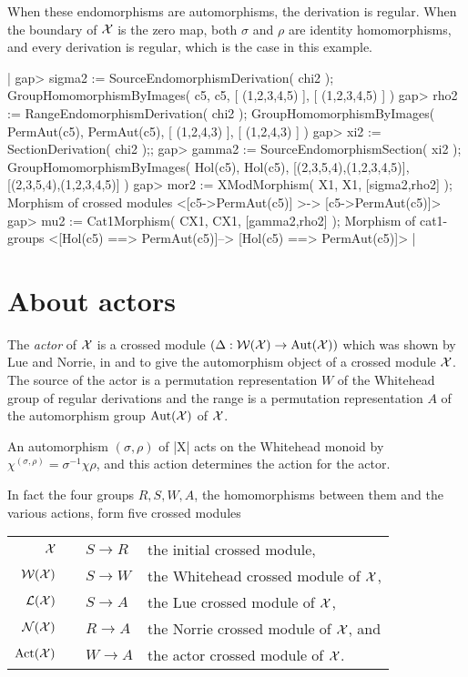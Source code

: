 When these endomorphisms are automorphisms, the derivation is regular.  
When the boundary of ${\cal X}$ is the zero map,
both $\sigma$ and $\rho$ are identity homomorphisms, 
and every derivation is regular, which is the case in this example.

|    gap> sigma2 := SourceEndomorphismDerivation( chi2 );
    GroupHomomorphismByImages( c5, c5, [ (1,2,3,4,5) ], [ (1,2,3,4,5) ] )
    gap> rho2 := RangeEndomorphismDerivation( chi2 );
    GroupHomomorphismByImages( PermAut(c5), PermAut(c5), [ (1,2,4,3) ], 
       [ (1,2,4,3) ] )
    gap> xi2 := SectionDerivation( chi2 );;
    gap> gamma2 := SourceEndomorphismSection( xi2 );
    GroupHomomorphismByImages( Hol(c5), Hol(c5), [(2,3,5,4),(1,2,3,4,5)],
       [(2,3,5,4),(1,2,3,4,5)] )
    gap> mor2 := XModMorphism( X1, X1, [sigma2,rho2] );
    Morphism of crossed modules <[c5->PermAut(c5)] >-> [c5->PermAut(c5)]>
    gap> mu2 := Cat1Morphism( CX1, CX1, [gamma2,rho2] );
    Morphism of cat1-groups <[Hol(c5) ==> PermAut(c5)]-->
       [Hol(c5) ==> PermAut(c5)]>  |



\section{About actors}


The \emph{actor} of ${\cal X}$  is a crossed module
$(\Delta \: {\cal W}({\cal X}) \to {\rm Aut}({\cal X}))$
which was shown by Lue and Norrie, in \cite{N2} and \cite{N1} to give
the automorphism object of a crossed module ${\cal X}$.
The source of the actor is a permutation representation $W$ 
of the Whitehead group of regular derivations and the range is a 
permutation representation $A$ of the automorphism group 
${\rm Aut}({\cal X})$ of ${\cal X}$.

An automorphism $( \sigma, \rho )$ of |X| acts on the Whitehead monoid by
$\chi^{(\sigma,\rho)} = \sigma^{-1} \chi \rho$, and this action
determines the action for the actor.

In fact the four groups $R, S, W, A$,  the homomorphisms between them
and the various actions, form five crossed modules\:

\begin{tabular}{rcll}
   ${\cal X}$ &\:& $S \to R$  &  the initial crossed module,                 \\
${\cal W(X)}$ &\:& $S \to W$  &  the Whitehead crossed module of ${\cal X}$, \\
${\cal L(X)}$ &\:& $S \to A$  &  the Lue crossed module of ${\cal X}$,       \\
${\cal N(X)}$ &\:& $R \to A$  &  the Norrie crossed module of ${\cal X}$, and \\
${\rm Act}({\cal X})$ &\:& $W \to A$  &  the actor crossed module of ${\cal X}$.
\end{tabular}

